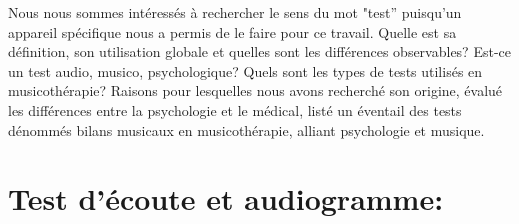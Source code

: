 



Nous nous sommes intéressés à rechercher le sens du mot "test'' puisqu'un appareil spécifique nous a permis de le faire pour ce travail. Quelle est sa définition, son utilisation globale et quelles sont les différences observables?
Est-ce un test audio, musico, psychologique?
Quels sont les types de tests utilisés en musicothérapie?
Raisons pour lesquelles nous avons recherché son origine, évalué les différences entre la psychologie et le médical, listé un éventail des tests dénommés bilans musicaux en musicothérapie, alliant psychologie et musique.


\section{Test d'écoute et audiogramme:}


